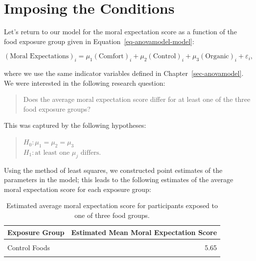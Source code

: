 \documentclass[
  letterpaper,
  DIV=11,
  numbers=noendperiod]{scrreprt}
\theoremstyle{plain}
\theoremstyle{definition}
\theoremstyle{definition}
\theoremstyle{remark}
\begin{document}
\hypertarget{imposing-the-conditions-1}{%
\section{Imposing the Conditions}\label{imposing-the-conditions-1}}

Let's return to our model for the moral expectation score as a function
of the food exposure group given in Equation~\ref{eq-anovamodel-model}:

\[(\text{Moral Expectations})_i = \mu_1 (\text{Comfort})_i + \mu_2 (\text{Control})_i + \mu_3 (\text{Organic})_i + \varepsilon_i,\]

where we use the same indicator variables defined in
Chapter~\ref{sec-anovamodel}. We were interested in the following
research question:

\begin{quote}
Does the average moral expectation score differ for at least one of the
three food exposure groups?
\end{quote}

This was captured by the following hypotheses:

\begin{quote}
\(H_0: \mu_1 = \mu_2 = \mu_3\)\\
\(H_1: \text{at least one } \mu_j \text{ differs}.\)
\end{quote}

Using the method of least squares, we constructed point estimates of the
parameters in the model; this leads to the following estimates of the
average moral expectation score for each exposure group:

\hypertarget{tbl-anovaconditions-fit}{}
\begin{table}
\caption{\label{tbl-anovaconditions-fit}Estimated average moral expectation score for participants exposed to
one of three food groups. }\tabularnewline

\centering
\begin{tabular}[t]{lr}
\toprule
Exposure Group & Estimated Mean Moral Expectation Score\\
\midrule
\cellcolor{gray!6}{Comfort Foods} & \cellcolor{gray!6}{5.58}\\
Control Foods & 5.65\\
\cellcolor{gray!6}{Organic Foods} & \cellcolor{gray!6}{5.75}\\
\bottomrule
\end{tabular}
\end{table}
\end{document}
